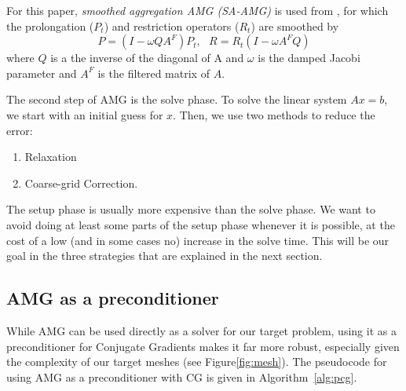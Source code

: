 For this paper, \textit{smoothed aggregation AMG (SA-AMG)} is used from \cite{treister2015non}, for which the prolongation ($P_t$) and restriction
operators ($R_t$) are smoothed by
\begin{equation}
 P = (I - \omega QA^{F})P_t, \ \ \ R = R_t(I - \omega A^{F}Q)
\end{equation}
where $Q$ is a the inverse of the diagonal of A and $\omega$ is the damped Jacobi parameter and $A^F$ is the filtered matrix of $A$.

The second step of AMG is the solve phase. To solve the linear system $Ax = b$, we start with an initial guess for $x$.
Then, we use two methods to reduce the error:
\begin{enumerate}
 \item Relaxation
 \item Coarse-grid Correction.
\end{enumerate}


The setup phase is usually more expensive than the solve phase.
We want to avoid doing at least some parts of the setup phase whenever it is possible,
at the cost of a low (and in some cases no) increase in the solve time.
This will be our goal in the three strategies that are explained in the next section.

\subsection{AMG as a preconditioner}

While AMG can be used directly as a solver for our target problem, using it as a preconditioner
for Conjugate Gradients makes it far more robust, especially given the complexity of our target
meshes (see Figure\ref{fig:mesh}). The pseudocode for using AMG as a preconditioner with CG is
given in Algorithm~\ref{alg:pcg}.

